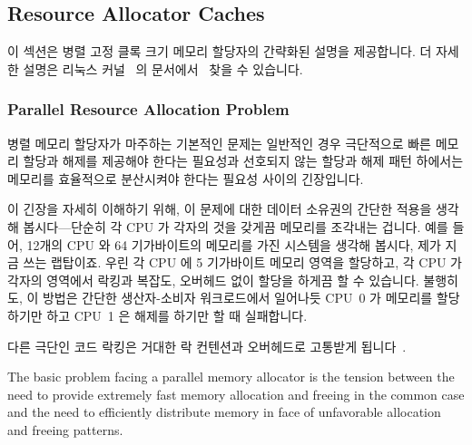 \subsection{Resource Allocator Caches}
\label{sec:SMPdesign:Resource Allocator Caches}

이 섹션은 병렬 고정 클록 크기 메모리 할당자의 간략화된 설명을 제공합니다.
더 자세한 설명은 리눅스 커널~\cite{Torvalds2.6kernel} 의
문서에서~\cite{McKenney92a,McKenney93,Bonwick01slab,McKenney01e,JasonEvans2011jemalloc,ChrisKennelly2020tcmalloc}
찾을 수 있습니다.

\subsubsection{Parallel Resource Allocation Problem}

병렬 메모리 할당자가 마주하는 기본적인 문제는 일반적인 경우 극단적으로 빠른
메모리 할당과 해제를 제공해야 한다는 필요성과 선호되지 않는 할당과 해제 패턴
하에서는 메모리를 효율적으로 분산시켜야 한다는 필요성 사이의 긴장입니다.

이 긴장을 자세히 이해하기 위해, 이 문제에 대한 데이터 소유권의 간단한 적용을
생각해 봅시다---단순히 각 CPU 가 각자의 것을 갖게끔 메모리를 조각내는 겁니다.
예를 들어, 12개의 CPU 와 64 기가바이트의 메모리를 가진 시스템을 생각해 봅시다,
제가 지금 쓰는 랩탑이죠.
우린 각 CPU 에 5 기가바이트 메모리 영역을 할당하고, 각 CPU 가 각자의 영역에서
락킹과 복잡도, 오버헤드 없이 할당을 하게끔 할 수 있습니다.
불행히도, 이 방법은 간단한 생산자-소비자 워크로드에서 일어나듯 CPU~0 가
메모리를 할당하기만 하고 CPU~1 은 해제를 하기만 할 때 실패합니다.

다른 극단인 코드 락킹은 거대한 락 컨텐션과 오버헤드로 고통받게
됩니다~\cite{McKenney93}.

\iffalse

The basic problem facing a parallel memory allocator is the tension
between the need to provide extremely fast memory allocation and
freeing in the common case and the need to efficiently distribute
memory in face of unfavorable allocation and freeing patterns.

